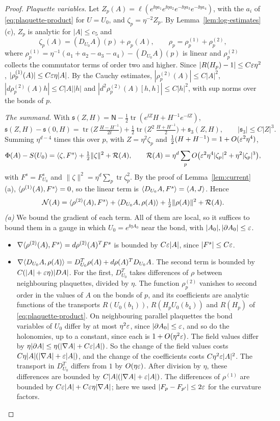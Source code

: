 \begin{proof}
\emph{Plaquette variables.} Let $Z_p(A)=\ell(e^{\ii\eta a_1}e^{\ii\eta a_2}e^{-\ii\eta a_3}e^{-\ii\eta a_4})$, with the $a_i$ of \eqref{eq:plaquette-product} for $U=U_0$, and $\zeta_p=\eta^{-2}Z_p$. By Lemma~\ref{lem:log-estimates}(c), $Z_p$ is analytic for $|A|\le c_5$ and
\[
\zeta_p(A)=(D_{U_0}A)(p)+\rho_p(A),\qquad\rho_p=\rho_p^{(1)}+\rho_p^{(2)},
\]
where $\rho^{(1)}_p=\eta^{-1}(a_1+a_2-a_3-a_4)-(D_{U_0}A)(p)$ is linear and $\rho^{(2)}_p$ collects the commutator terms of order two and higher. Since $|R(H_p)-1|\le C\varepsilon\eta^2$, $|\rho^{(1)}_p(A)|\le C\varepsilon\eta|A|$. By the Cauchy estimates, $|\rho^{(2)}_p(A)|\le C|A|^2$, $|d\rho^{(2)}_p(A)h|\le C|A||h|$ and $|d^2\rho^{(2)}_p(A)[h,h]|\le C|h|^2$, with sup norms over the bonds of $p$.

\emph{The summand.} With $\mathfrak s(Z,H)=\mathsf N-\frac12\operatorname{tr}(e^{\ii Z}H+H^{-1}e^{-\ii Z})$,
\[
\mathfrak s(Z,H)-\mathfrak s(0,H)=\operatorname{tr}\Big(Z\,\tfrac{H-H^{-1}}{2\ii}\Big)+\tfrac12\operatorname{tr}\Big(Z^2\,\tfrac{H+H^{-1}}2\Big)+\mathfrak s_3(Z,H),\qquad|\mathfrak s_3|\le C|Z|^3 .
\]
Summing $\eta^{d-4}$ times this over $p$, with $Z=\eta^2\zeta_p$ and $\frac12(H+H^{-1})=1+O(\varepsilon^2\eta^4)$,
\[
\Phi(A)-S(U_0)=\langle \zeta,F^s\rangle+\tfrac12\|\zeta\|^2+\mathcal R(A),\qquad\mathcal R(A)=\eta^d\sum_pO\big(\varepsilon^2\eta^4|\zeta_p|^2+\eta^2|\zeta_p|^3\big),
\]
with $F^s=F^s_{U_0}$ and $\|\zeta\|^2=\eta^d\sum_p\operatorname{tr}\zeta_p^2$. By the proof of Lemma~\ref{lem:current}(a), $\langle \rho^{(1)}(A),F^s\rangle=0$, so the linear term is $\langle D_{U_0}A,F^s\rangle=\langle A,J\rangle$. Hence
\[
\mathcal N(A)=\langle \rho^{(2)}(A),F^s\rangle+\langle D_{U_0}A,\rho(A)\rangle+\tfrac12\|\rho(A)\|^2+\mathcal R(A).
\]
\emph{(a)} We bound the gradient of each term. All of them are local, so it suffices to bound them in a gauge in which $U_0=e^{\ii\eta A_0}$ near the bond, with $|A_0|,|\partial A_0|\le\varepsilon$.
\begin{itemize}
\item $\nabla\langle \rho^{(2)}(A),F^s\rangle=d\rho^{(2)}(A)^TF^s$ is bounded by $C\varepsilon|A|$, since $|F^s|\le C\varepsilon$.
\item $\nabla\langle D_{U_0}A,\rho(A)\rangle=D_{U_0}^T\rho(A)+d\rho(A)^TD_{U_0}A$. The second term is bounded by $C(|A|+\varepsilon\eta)|DA|$. For the first, $D^T_{U_0}$ takes differences of $\rho$ between neighbouring plaquettes, divided by $\eta$. The function $\rho^{(2)}_p$ vanishes to second order in the values of $A$ on the bonds of $p$, and its coefficients are analytic functions of the transports $R(U_0(b_1))$, $R(H_pU_0(b_4))$ and $R(H_p)$ of \eqref{eq:plaquette-product}. On neighbouring parallel plaquettes the bond variables of $U_0$ differ by at most $\eta^2\varepsilon$, since $|\partial A_0|\le\varepsilon$, and so do the holonomies, up to a constant, since each is $1+O(\eta^2\varepsilon)$. The field values differ by $\eta|\partial A|\le\eta(|\nabla A|+C\varepsilon|A|)$. So the change of the field values costs $C\eta|A|(|\nabla A|+\varepsilon|A|)$, and the change of the coefficients costs $C\eta^2\varepsilon|A|^2$. The transport in $D^T_{U_0}$ differs from $1$ by $O(\eta\varepsilon)$. After division by $\eta$, these differences are bounded by $C|A|(|\nabla A|+\varepsilon|A|)$. The differences of $\rho^{(1)}$ are bounded by $C\varepsilon|A|+C\varepsilon\eta|\nabla A|$; here we used $|F_p-F_{p'}|\le2\varepsilon$ for the curvature factors.

\end{itemize}
\end{proof}
